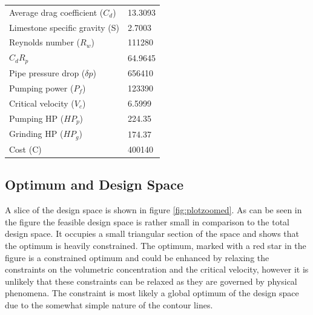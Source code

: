 \documentclass{article}
\begin{document}
\begin{center}
\begin{tabular}{|l|l|}
	Average drag coefficient ($C_d$)         & 13.3093                   \\
	Limestone specific gravity (S)           & 2.7003                    \\
	Reynolds number ($R_w$)                  & 111280                    \\
	$C_dR_p$                                 & 64.9645                   \\
	Pipe pressure drop ($\delta p$)          & 656410                    \\
	Pumping power ($P_f$)                    & 123390                    \\
	Critical velocity ($V_c$)                & 6.5999                    \\
	Pumping HP ($HP_p$)						 & 224.35					 \\
	Grinding HP ($HP_g$)					 & 174.37					 \\
	Cost (C)                                 & 400140                    \\
	\hline
\end{tabular}
\end{center}
\subsection{Optimum and Design Space}
A slice of the design space is shown in figure \ref{fig:plotzoomed}.  As can be seen in the figure the feasible design space is rather small in comparison to the total design space. It occupies a small triangular section of the space and shows that the optimum is heavily constrained. The optimum, marked with a red star in the figure is a constrained optimum and could be enhanced by relaxing the constraints on the volumetric concentration and the critical velocity, however it is unlikely that these constraints can be relaxed as they are governed by physical phenomena.  The constraint is most likely a global optimum of the design space due to the somewhat simple nature of the contour lines.
\end{document}
